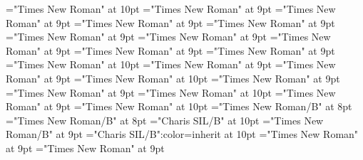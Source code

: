 \documentclass[gps1,twoside]{article}
\begin{document}
\font\spanenspanspanspansensespanspandiventryletData="Times New Roman" at 10pt
\font\spanabbreviationsemanticdomainsemanticdomainssensesensessensesensessubentrysubentriesentrylastchildafterspanspanspansensespanspandiventryletData="Times New Roman" at 9pt
\font\spannameacademicdomainacademicdomainssensesensessensesensessubentrysubentriesentryfirstchildbeforespanspanspansensespanspandiventryletData="Times New Roman" at 9pt
\font\spannameacademicdomainacademicdomainssensesensessensesensessubentrysubentriesentrylastchildafterspanspanspansensespanspandiventryletData="Times New Roman" at 9pt
\font\semanticdomainsemanticdomainsemanticdomainssensesensessensesensesentrybeforespansensespanspandiventryletData="Times New Roman" at 9pt
\font\picturesentryafterdiventryletData="Times New Roman" at 9pt
\font\picturepicturesentryspandiventryletData="Times New Roman" at 9pt
\font\picturepicturessubentrysubentriesentrypicturepicturesentryspandiventryletData="Times New Roman" at 9pt
\font\picturepicturessubentrysubentriesentryafterpicturepicturesentryspandiventryletData="Times New Roman" at 9pt
\font\sensenumberpicturepicturesentryspandiventryletData="Times New Roman" at 9pt
\font\spanensensenumberpicturepicturesentryspandiventryletData="Times New Roman" at 10pt
\font\captionpicturepicturesentryspandiventryletData="Times New Roman" at 9pt
\font\spancaptionpicturepicturesentryspandiventryletData="Times New Roman" at 9pt
\font\spanenspancaptionpicturepicturesentryspandiventryletData="Times New Roman" at 10pt
\font\scientificnamesensespanspandiventryletData="Times New Roman" at 9pt
\font\scientificnamesensesensesentryaftersensespanspandiventryletData="Times New Roman" at 9pt
\font\spanenscientificnamesensespanspandiventryletData="Times New Roman" at 10pt
\font\subentriesdiventryletData="Times New Roman" at 9pt
\font\subentrysubentriesentrysubentriesdiventryletData="Times New Roman" at 10pt
\font\headwordsubentrysubentriesentrysubentriesdiventryletData="Times New Roman/B" at 8pt
\font\headwordaftersubentrysubentriesentrysubentriesdiventryletData="Times New Roman/B" at 8pt
\font\spanbzhheadwordsubentrysubentriesentrysubentriesdiventryletData="Charis SIL/B" at 10pt
\font\spanheadwordsubentrysubentriesentrylastchildafterheadwordsubentrysubentriesentrysubentriesdiventryletData="Times New Roman/B" at 9pt
\font\aspanbzhheadwordsubentrysubentriesentrysubentriesdiventryletData="Charis SIL/B":color=inherit at 10pt
\font\spansubentrysubentriesentrysubentriesdiventryletData="Times New Roman" at 9pt
\font\complexformtypessubentrysubentriesentryaftersubentrysubentriesentrysubentriesdiventryletData="Times New Roman" at 9pt
\end{document}
